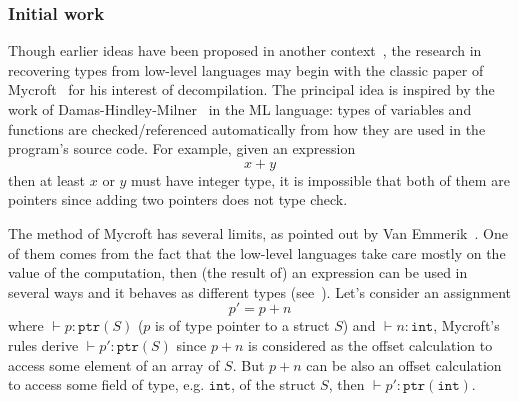 \documentclass[compsoc,conference,a4paper,10pt,times]{IEEEtran}
\begin{document}
\subsubsection*{Initial work}
\noindent
Though earlier ideas have been proposed in another context~\cite{shivers_data-flow_1990},
the research in recovering types from low-level languages may begin with the classic paper of
Mycroft~\cite{mycroft_type-based_1999} for his interest of decompilation. The principal idea is
inspired by the work of Damas-Hindley-Milner~\cite{milner_theory_1978,hindley_principal_1969,damas_principal_1982} in
the ML language: types of variables and functions are checked/referenced automatically
from how they are used in the program's source code. For example, given an expression
\begin{equation*}
  x + y
\end{equation*}
then at least $x$ or $y$ must have integer type, it is impossible that both of them are pointers
since adding two pointers does not type check.

The method of Mycroft has several limits, as pointed out by Van Emmerik~\cite{van_emmerik_static_2007}.
One of them comes from the fact that the low-level languages take care mostly on the value of
the computation, then (the result of) an expression can be used in several ways and it behaves as
different types (see~). Let's consider an assignment
\begin{equation*}
  p' = p + n
\end{equation*}
where $\vdash p \colon \mathtt{ptr}(S)$ ($p$ is of type pointer to a struct $S$) and
$\vdash n \colon \mathtt{int}$, Mycroft's
rules derive $\vdash p' \colon \mathtt{ptr}(S)$ since $p + n$ is considered as the offset calculation to
access some element of an array of $S$. But $p + n$ can be also an
offset calculation to access some field of type, e.g. $\mathtt{int}$, of the struct $S$,
then $\vdash p' \colon \mathtt{ptr}(\mathtt{int})$.
\end{document}
